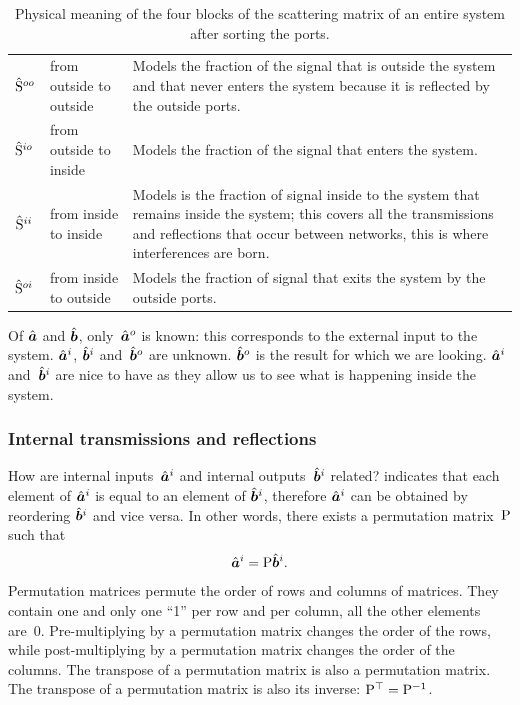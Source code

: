 \begin{table}
    \centering
    \begin{tabularx}{\textwidth}{l l X}
        \toprule
        $\hat{\mathrm{S}}^{oo}$ & from outside to outside &
        Models the fraction of the signal that is outside the system and that never enters the system because it is reflected by the outside ports.
        \\
        $\hat{\mathrm{S}}^{io}$ & from outside to inside &
        Models the fraction of the signal that enters the system.
        \\
        $\hat{\mathrm{S}}^{ii}$ & from inside to inside &
        Models is the fraction of signal inside to the system that remains inside the system; this covers all the transmissions and reflections that occur between networks, this is where interferences are born.
        \\
        $\hat{\mathrm{S}}^{oi}$ & from inside to outside &
        Models the fraction of signal that exits the system by the outside ports.
        \\
        \bottomrule
    \end{tabularx}
    \caption{Physical meaning of the four blocks of the scattering matrix
    of an entire system after sorting the ports.}
    \label{tab:four_blocks_meaning}
\end{table}

Of $\hat{\bm{a}}$ and $\hat{\bm{b}}$, only~$\hat{\bm{a}}^o$ is known: this corresponds to the external input to the system.
$\hat{\bm{a}}^i$, $\hat{\bm{b}}^i$ and~$\hat{\bm{b}}^o$ are unknown.
$\hat{\bm{b}}^o$ is the result for which we are looking.
$\hat{\bm{a}}^i$ and~$\hat{\bm{b}}^i$ are nice to have as they allow us to see what is happening inside the system.




\subsubsection{Internal transmissions and reflections}

How are internal inputs~$\hat{\bm{a}}^i$ and internal outputs~$\hat{\bm{b}}^i$ related?
 indicates that each element of $\hat{\bm{a}}^i$ is equal to an element of $\hat{\bm{b}}^i$, therefore $\hat{\bm{a}}^i$ can be obtained by reordering $\hat{\bm{b}}^i$ and vice versa.
In other words, there exists a permutation matrix~$\mathrm{P}$ such that
\begin{equation}
    \hat{\bm{a}}^i = \mathrm{P} \hat{\bm{b}}^i \text{.} \label{eq:relation_ai_bi}
\end{equation}
Permutation matrices permute the order of rows and columns of matrices.
They contain one and only one ``1'' per row and per column, all the other elements are~0.
Pre-multiplying by a permutation matrix changes the order of the rows,
while post-multiplying by a permutation matrix changes the order of the columns.
The transpose of a permutation matrix is also a permutation matrix.
The transpose of a permutation matrix is also its inverse: $\mathrm{P}^\top = \mathrm{P}^{-1}$.

